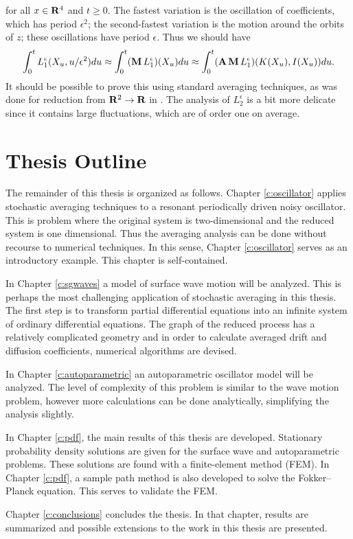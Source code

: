 for all $x \in \mathbf R^4$ and $t \ge 0$. The fastest variation is the oscillation of coefficients, which has period $\epsilon^2$; the second-fastest variation is the motion around the orbits of $z$; these oscillations have period $\epsilon$. Thus we should have
\[
\int_0^t L^\epsilon_1(X_u,u/\epsilon^2)du \approx \int_0^t (\operatorname{\mathbf M} L^\epsilon_1)(X_u)du \approx \int_0^t(\operatorname{\mathbf A} \operatorname{\mathbf M} L^\epsilon_1)(K(X_u),I(X_u)) du.
\]
It should be possible to prove this using standard averaging techniques, as was done for reduction from $\mathbf R^2 \to \mathbf R$ in \citet{namachchivaya01:_unified_approac_noisy_nonlin_mathieu_type_system}.
The analysis of $L^\epsilon_2$ is a bit more delicate since it contains large fluctuations, which are of order one on average.

\section{Thesis Outline}

The remainder of this thesis is organized as follows. Chapter \ref{c:oscillator} applies stochastic averaging techniques to a resonant periodically driven noisy oscillator. This is problem where the original system is two-dimensional and the reduced system is one dimensional. Thus the averaging analysis can be done without recourse to numerical techniques. In this sense, Chapter \ref{c:oscillator} serves as an introductory example. This chapter is self-contained.

In Chapter \ref{c:sgwaves} a model of surface wave motion will be analyzed. This is perhaps the most challenging application of stochastic averaging in this thesis. The first step is to transform partial differential equations into an infinite system of ordinary differential equations. The graph of the reduced process has a relatively complicated geometry and in order to calculate averaged drift and diffusion coefficients, numerical algorithms are devised.

In Chapter \ref{c:autoparametric} an autoparametric oscillator model will be analyzed. The level of complexity of this problem is similar to the wave motion problem, however more calculations can be done analytically, simplifying the analysis slightly.

In Chapter \ref{c:pdf}, the main results of this thesis are developed. Stationary probability density solutions are given for the surface wave and autoparametric problems. These solutions are found with a finite-element method (FEM). In Chapter \ref{c:pdf}, a sample path method is also developed to solve the Fokker--Planck equation. This serves to validate the FEM.

Chapter \ref{c:conclusions} concludes the thesis. In that chapter, results are summarized and possible extensions to the work in this thesis are presented.



